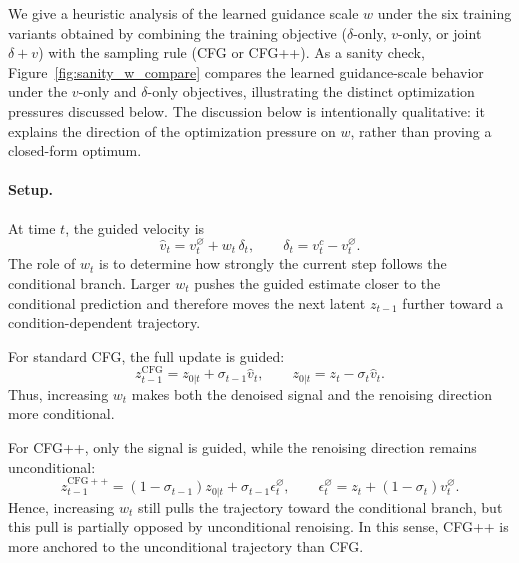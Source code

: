 \documentclass[acmtog]{acmart}
\begin{document}
We give a heuristic analysis of the learned guidance scale \(w\) under the six training variants obtained by combining the training objective
(\(\delta\)-only, \(v\)-only, or joint \(\delta{+}v\))
with the sampling rule (CFG or CFG++).
As a sanity check, Figure~\ref{fig:sanity_w_compare} compares the learned guidance-scale behavior under the \(v\)-only and \(\delta\)-only objectives, illustrating the distinct optimization pressures discussed below.
The discussion below is intentionally qualitative: it explains the direction of the optimization pressure on \(w\), rather than proving a closed-form optimum.

\paragraph{Setup.}
At time \(t\), the guided velocity is
\begin{equation}
\hat v_t = v_t^{\varnothing} + w_t \,\delta_t,
\qquad
\delta_t = v_t^c - v_t^{\varnothing}.
\end{equation}
The role of \(w_t\) is to determine how strongly the current step follows the conditional branch.
Larger \(w_t\) pushes the guided estimate closer to the conditional prediction and therefore moves the next latent \(z_{t-1}\) further toward a condition-dependent trajectory.

For standard CFG, the full update is guided:
\begin{equation}
z_{t-1}^{\mathrm{CFG}}
=
z_{0|t} + \sigma_{t-1}\hat v_t,
\qquad
z_{0|t}=z_t-\sigma_t \hat v_t.
\end{equation}
Thus, increasing \(w_t\) makes both the denoised signal and the renoising direction more conditional.

For CFG++, only the signal is guided, while the renoising direction remains unconditional:
\begin{equation}
z_{t-1}^{\mathrm{CFG++}}
=
(1-\sigma_{t-1}) z_{0|t} + \sigma_{t-1}\epsilon_t^{\varnothing},
\qquad
\epsilon_t^{\varnothing}=z_t+(1-\sigma_t)v_t^{\varnothing}.
\end{equation}
Hence, increasing \(w_t\) still pulls the trajectory toward the conditional branch, but this pull is partially opposed by unconditional renoising.
In this sense, CFG++ is more anchored to the unconditional trajectory than CFG.
\end{document}
